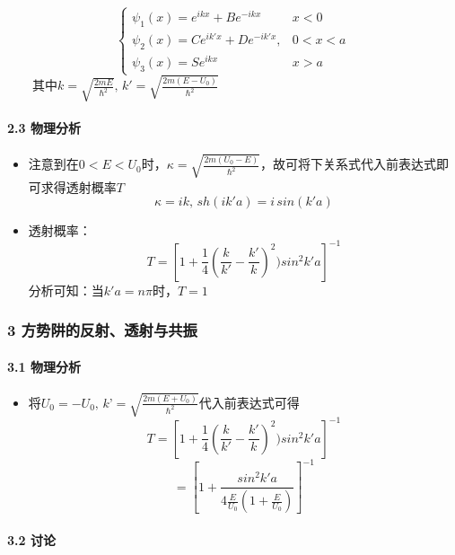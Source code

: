 \documentclass[UTF8,twocolumn]{ctexart}
\providecommand{\tightlist}{%
  \setlength{\itemsep}{0pt}\setlength{\parskip}{0pt}}
\let\oldparagraph\paragraph
\renewcommand{\paragraph}[1]{\oldparagraph{#1}\mbox{}}
\begin{document}
\[\begin{cases} 
        \psi_1(x)=e^{ikx}+Be^{-ikx} & x<0\\
        \psi_2(x)=Ce^{ik'x}+De^{-ik'x}, & 0<x<a\\
        \psi_3(x)=Se^{ikx} & x>a
\end{cases}\]
  其中\(k=\sqrt{\frac{2mE}{\hbar^2}},\,k'=\sqrt{\frac{2m(E-U_0)}{\hbar^2}}\)

\hypertarget{ux7269ux7406ux5206ux6790-2}{%
\paragraph{{ }2.3 物理分析}\label{ux7269ux7406ux5206ux6790-2}}

\begin{itemize}
\tightlist
\item
  注意到在\(0<E<U_0\)时，\(\kappa=\sqrt{\frac{2m(U_0-E)}{\hbar^2}}\)，故可将下关系式代入前表达式即可求得透射概率\(T\)
  \[
  \kappa=ik,\,sh(ik'a)=i\,sin(k'a)
  \]
\item
  透射概率： \[
  T=[1+\frac{1}{4}(\frac{k}{k'}-\frac{k'}{k})^2)sin^2k'a]^{-1}
  \]
  分析可知：当\(k'a=n\pi\)时，\(T=1\)
\end{itemize}

\hypertarget{ux65b9ux52bfux9631ux7684ux53cdux5c04ux900fux5c04ux4e0eux5171ux632f}{%
\subsubsection{3
方势阱的反射、透射与共振}\label{ux65b9ux52bfux9631ux7684ux53cdux5c04ux900fux5c04ux4e0eux5171ux632f}}

\hypertarget{ux7269ux7406ux5206ux6790-3}{%
\paragraph{{ }3.1 物理分析}\label{ux7269ux7406ux5206ux6790-3}}

\begin{itemize}
\tightlist
\item
  将\(U_0=-U_0,\,k’=\sqrt{\frac{2m(E+U_0)}{\hbar^2}}\)代入前表达式可得
  \[
  T=[1+\frac{1}{4}(\frac{k}{k'}-\frac{k'}{k})^2)sin^2k'a]^{-1}\]
  \[
  =[1+\frac{sin^2k'a}{4\frac{E}{U_0}(1+\frac{E}{U_0})}]^{-1}
  \]
\end{itemize}

\hypertarget{ux8ba8ux8bba-5}{%
\paragraph{{ }3.2 讨论}\label{ux8ba8ux8bba-5}}
\end{document}
